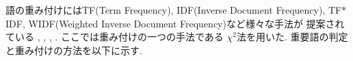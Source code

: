 \noindent
語の重み付けにはTF\hspace{0.2mm}(\hspace{0.5mm}Term \hspace{0.2mm}Frequency\hspace{0.5mm}),
 \hspace{0.5mm}IDF\hspace{0.2mm}(\hspace{0.5mm}Inverse \hspace{0.2mm}Document \hspace{0.2mm}Frequency\hspace{0.5mm}), \hspace{0.1mm}TF\hspace{0.5mm}$\ast$\hspace{0.5mm}IDF,\hspace{0.2mm} WIDF(Weighted Inverse Document Frequency)など様々な手法が
提案されている \cite{Luhn1957}, \cite{Sparck1972}, \cite{Salton1983}, \cite{Tokunaga1994}.  ここでは重み付けの一つの手法である
$\chi^2$法を用いた.  重要語の判定と重み付けの方法を以下に示す.
